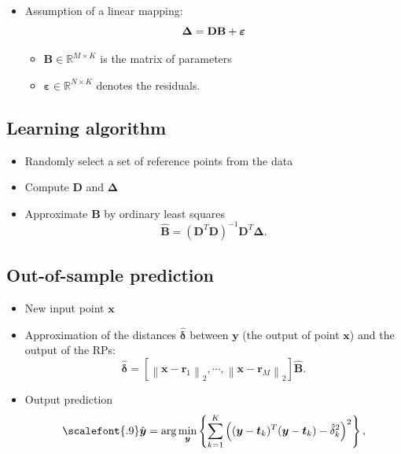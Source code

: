 \documentclass[final]{beamer}
\renewcommand{\vec}{\boldsymbol}
\begin{document}
\begin{frame}[t]
\begin{multicols}{3}
\begin{itemize}
    \item Assumption of a linear mapping:
    \begin{equation}
    \mathbf{\Delta} = \mathbf{D} \mathbf{B} + \boldsymbol{\varepsilon}
    \vspace{-1.5em}
    \end{equation}
    \begin{itemize}
    	\item $\mathbf{B} \in \mathbb{R}^{M \times K}$ is the matrix of parameters
    	\item $\boldsymbol{\varepsilon} \in \mathbb{R}^{N \times K}$ denotes the residuals.
    \end{itemize}
\end{itemize}

\subsection{Learning algorithm}
\begin{itemize}
	\item Randomly select a set of reference points from the data
    \item Compute $\mathbf{D}$ and $\mathbf{\Delta}$
    \item Approximate $\mathbf{B}$ by ordinary least squares
    \begin{equation}
    \hat{\mathbf{B}}= (\mathbf{D}^T\mathbf{D})^{-1}\mathbf{D}^T\mathbf{\Delta}. \label{eq: MRLS}
    \end{equation}
\end{itemize}


\subsection{Out-of-sample prediction}

\begin{itemize}
	\item New input point $\vec{x}$
    \item Approximation of the distances $\hat{\vec{\delta}}$  between $\vec{y}$ (the output of point $\vec{x}$) and the output of the RPs:
    \begin{equation}
\hat{\vec{\delta}} = \left[\left \| \vec{x} -  \vec{r}_1 \right \|_2, \cdots, \left \| \vec{x} -  \vec{r}_M \right \|_2 \right] \hat{\mathbf{B}}.
\end{equation}
	\item Output prediction
    \begin{equation}\scalefont{.9}
\hat{\vec{y}} = \arg \min_{\vec{y}} \left\{ \sum_{k=1}^{K}\left( (\vec{y} - \vec{t}_k)^T(\vec{y} - \vec{t}_k) - \hat{\delta}_k^2 \right)^2 \right\}, \label{eq: optimization}
\end{equation}
\end{itemize}



\end{multicols}
\end{frame}
\end{document}
